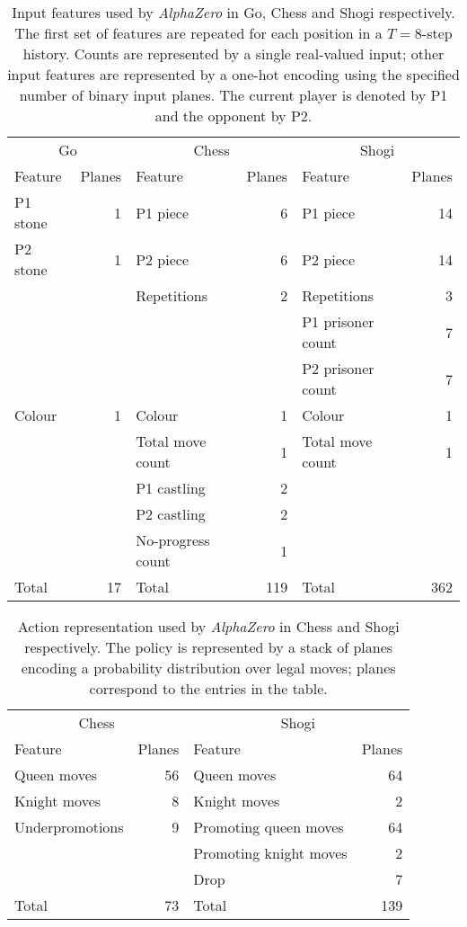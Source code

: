 \documentclass[12pt]{article}
\begin{document}
\begin{table}
\begin{tabularx}{\textwidth}{Xr | Xr | Xr}
\toprule
\multicolumn{2}{c}{Go} & \multicolumn{2}{|c|}{Chess} & \multicolumn{2}{c}{Shogi} \\
Feature & Planes & Feature & Planes & Feature & Planes \\
\midrule
P1 stone & 1 & P1 piece & 6 & P1 piece & 14 \\
P2 stone & 1 & P2 piece & 6 & P2 piece & 14 \\
&& Repetitions & 2 & Repetitions & 3 \\
&& && P1 prisoner count & 7 \\
&& && P2 prisoner count & 7 \\
\midrule
Colour & 1 & Colour & 1 & Colour & 1 \\
&& Total move count & 1 & Total move count & 1 \\
&& P1 castling & 2 &&\\
&& P2 castling & 2 &&\\
&& No-progress count & 1 &&\\
\midrule
Total & 17 & Total & 119 & Total & 362 \\
\bottomrule
\end{tabularx}
\caption
{
    \label{tab:features}
    Input features used by \emph{AlphaZero} in Go, Chess and Shogi respectively. The first set of features are repeated for each position in a $T=8$-step history. Counts are represented by a single real-valued input; other input features are represented by a one-hot encoding using the specified number of binary input planes. The current player is denoted by P1 and the opponent by P2.
}
\end{table}

\begin{table}
\begin{tabularx}{\textwidth}{Xr | Xr}
\toprule
\multicolumn{2}{c|}{Chess} & \multicolumn{2}{c}{Shogi} \\
Feature & Planes & Feature & Planes \\
\midrule
Queen moves & 56 & Queen moves & 64 \\
Knight moves & 8 & Knight moves & 2 \\
Underpromotions & 9 & Promoting queen moves & 64 \\
&& Promoting knight moves & 2 \\
&& Drop & 7 \\
\midrule
Total & 73 & Total & 139 \\
\bottomrule
\end{tabularx}
\caption
{
    \label{tab:actions}
    Action representation used by \emph{AlphaZero} in Chess and Shogi respectively. The policy is represented by a stack of planes encoding a probability distribution over legal moves; planes correspond to the entries in the table.  
}
\end{table}
\end{document}
